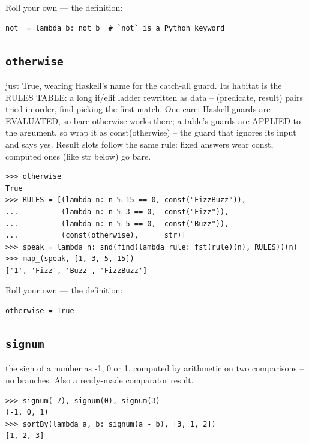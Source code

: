 \documentclass[10pt,letterpaper]{book}
\begin{document}
Roll your own --- the definition:

\begin{lstlisting}[style=ex]
not_ = lambda b: not b  # `not` is a Python keyword
\end{lstlisting}

\subsection{\texttt{otherwise}}\label{def:otherwise}
just True, wearing Haskell's name for the catch-all guard. Its habitat is the RULES TABLE: a long if/elif ladder rewritten as data -- (predicate, result) pairs tried in order, find picking the first match. One care: Haskell guards are EVALUATED, so bare otherwise works there; a table's guards are APPLIED to the argument, so wrap it as const(otherwise) -- the guard that ignores its input and says yes. Result slots follow the same rule: fixed answers wear const, computed ones (like str below) go bare.
\begin{lstlisting}[style=ex]
>>> otherwise
True
>>> RULES = [(lambda n: n % 15 == 0, const("FizzBuzz")),
...          (lambda n: n % 3 == 0,  const("Fizz")),
...          (lambda n: n % 5 == 0,  const("Buzz")),
...          (const(otherwise),      str)]
>>> speak = lambda n: snd(find(lambda rule: fst(rule)(n), RULES))(n)
>>> map_(speak, [1, 3, 5, 15])
['1', 'Fizz', 'Buzz', 'FizzBuzz']
\end{lstlisting}

Roll your own --- the definition:

\begin{lstlisting}[style=ex]
otherwise = True
\end{lstlisting}

\subsection{\texttt{signum}}\label{def:signum}
the sign of a number as -1, 0 or 1, computed by arithmetic on two comparisons -- no branches. Also a ready-made comparator result.
\begin{lstlisting}[style=ex]
>>> signum(-7), signum(0), signum(3)
(-1, 0, 1)
>>> sortBy(lambda a, b: signum(a - b), [3, 1, 2])
[1, 2, 3]
\end{lstlisting}
\end{document}
